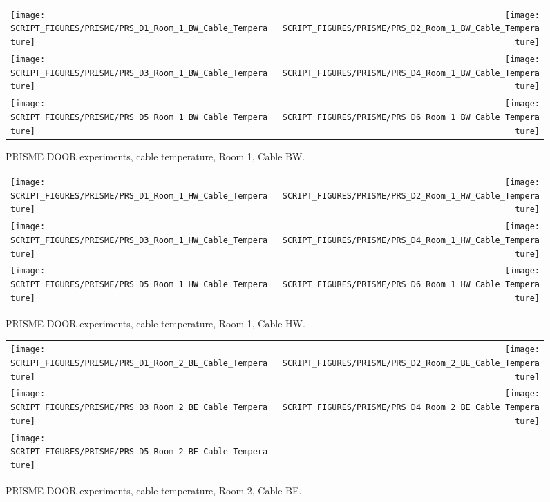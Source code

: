 \begin{figure}[p]
\begin{tabular*}{\textwidth}{l@{\extracolsep{\fill}}r}
\texttt{[image: SCRIPT\_FIGURES/PRISME/PRS\_D1\_Room\_1\_BW\_Cable\_Temperature]} &
\texttt{[image: SCRIPT\_FIGURES/PRISME/PRS\_D2\_Room\_1\_BW\_Cable\_Temperature]} \\
\texttt{[image: SCRIPT\_FIGURES/PRISME/PRS\_D3\_Room\_1\_BW\_Cable\_Temperature]} &
\texttt{[image: SCRIPT\_FIGURES/PRISME/PRS\_D4\_Room\_1\_BW\_Cable\_Temperature]} \\
\texttt{[image: SCRIPT\_FIGURES/PRISME/PRS\_D5\_Room\_1\_BW\_Cable\_Temperature]} &
\texttt{[image: SCRIPT\_FIGURES/PRISME/PRS\_D6\_Room\_1\_BW\_Cable\_Temperature]}
\end{tabular*}
\caption[PRISME DOOR experiments, cable temperature, Room 1, Cable BW]{PRISME DOOR experiments, cable temperature, Room 1, Cable BW.}
\label{PRISME_BW_Cable_Room_1}
\end{figure}

\begin{figure}[p]
\begin{tabular*}{\textwidth}{l@{\extracolsep{\fill}}r}
\texttt{[image: SCRIPT\_FIGURES/PRISME/PRS\_D1\_Room\_1\_HW\_Cable\_Temperature]} &
\texttt{[image: SCRIPT\_FIGURES/PRISME/PRS\_D2\_Room\_1\_HW\_Cable\_Temperature]} \\
\texttt{[image: SCRIPT\_FIGURES/PRISME/PRS\_D3\_Room\_1\_HW\_Cable\_Temperature]} &
\texttt{[image: SCRIPT\_FIGURES/PRISME/PRS\_D4\_Room\_1\_HW\_Cable\_Temperature]} \\
\texttt{[image: SCRIPT\_FIGURES/PRISME/PRS\_D5\_Room\_1\_HW\_Cable\_Temperature]} &
\texttt{[image: SCRIPT\_FIGURES/PRISME/PRS\_D6\_Room\_1\_HW\_Cable\_Temperature]}
\end{tabular*}
\caption[PRISME DOOR experiments, cable temperature, Room 1, Cable HW]{PRISME DOOR experiments, cable temperature, Room 1, Cable HW.}
\label{PRISME_HW_Cable_Room_1}
\end{figure}

\begin{figure}[p]
\begin{tabular*}{\textwidth}{l@{\extracolsep{\fill}}r}
\texttt{[image: SCRIPT\_FIGURES/PRISME/PRS\_D1\_Room\_2\_BE\_Cable\_Temperature]} &
\texttt{[image: SCRIPT\_FIGURES/PRISME/PRS\_D2\_Room\_2\_BE\_Cable\_Temperature]} \\
\texttt{[image: SCRIPT\_FIGURES/PRISME/PRS\_D3\_Room\_2\_BE\_Cable\_Temperature]} &
\texttt{[image: SCRIPT\_FIGURES/PRISME/PRS\_D4\_Room\_2\_BE\_Cable\_Temperature]} \\
\texttt{[image: SCRIPT\_FIGURES/PRISME/PRS\_D5\_Room\_2\_BE\_Cable\_Temperature]} &
\end{tabular*}
\caption[PRISME DOOR experiments, cable temperature, Room 2, Cable BE]{PRISME DOOR experiments, cable temperature, Room 2, Cable BE.}
\label{PRISME_BE_Cable_Room_2}
\end{figure}

